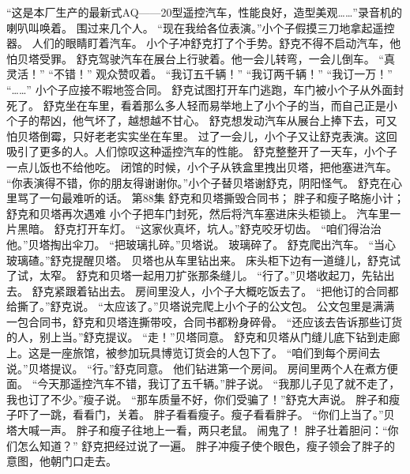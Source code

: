 \documentclass[a4paper,12pt,UTF8,twoside]{ctexbook}
\begin{document}
        “这是本厂生产的最新式AQ——20型遥控汽车，性能良好，造型美观……”录音机的喇叭叫唤着。 
        围过来几个人。 
        “现在我给各位表演。”小个子假摸三刀地拿起遥控器。 
        人们的眼睛盯着汽车。 
        小个子冲舒克打了个手势。舒克不得不启动汽车，他怕贝塔受罪。 
        舒克驾驶汽车在展台上行驶着。他一会儿转弯，一会儿倒车。 
        “真灵活！” 
        “不错！” 
        观众赞叹着。 
        “我订五千辆！” 
        “我订两千辆！” 
        “我订一万！” 
        “……” 
        小个子应接不暇地签合同。 
        舒克试图打开车门逃跑，车门被小个子从外面封死了。 
        舒克坐在车里，看着那么多人轻而易举地上了小个子的当，而自己正是小个子的帮凶，他气坏了，越想越不甘心。 
        舒克想发动汽车从展台上捧下去，可又怕贝塔倒霉，只好老老实实坐在车里。 
        过了一会儿，小个子又让舒克表演。这回吸引了更多的人。人们惊叹这种遥控汽车的性能。 
        舒克整整开了一天车，小个子一点儿饭也不给他吃。 
        闭馆的时候，小个子从铁盒里拽出贝塔，把他塞进汽车。 
        “你表演得不错，你的朋友得谢谢你。”小个子替贝塔谢舒克，阴阳怪气。 
        舒克在心里骂了一句最难听的话。       第88集 
        舒克和贝塔撕毁合同书； 
        胖子和瘦子略施小计； 
        舒克和贝塔再次遇难   
        小个子把车门封死，然后将汽车塞进床头柜锁上。 
        汽车里一片黑暗。 
        舒克打开车灯。 
        “这家伙真坏，坑人。”舒克咬牙切齿。 
        “咱们得治治他。”贝塔掏出伞刀。 
        “把玻璃扎碎。”贝塔说。 
        玻璃碎了。 
        舒克爬出汽车。 
        “当心玻璃碴。”舒克提醒贝塔。 
        贝塔也从车里钻出来。 
        床头柜下边有一道缝儿，舒克试了试，太窄。 
        舒克和贝塔一起用刀扩张那条缝儿。 
        “行了。”贝塔收起刀，先钻出去。 
        舒克紧跟着钻出去。 
        房间里没人，小个子大概吃饭去了。 
        “把他订的合同都给撕了。”舒克说。 
        “太应该了。”贝塔说完爬上小个子的公文包。 
        公文包里是满满一包合同书，舒克和贝塔连撕带咬，合同书都粉身碎骨。 
        “还应该去告诉那些订货的人，别上当。”舒克提议。 
        “走！”贝塔同意。 
        舒克和贝塔从门缝儿底下钻到走廊上。这是一座旅馆，被参加玩具博览订货会的人包下了。 
        “咱们到每个房间去说。”贝塔提议。 
        “行。”舒克同意。 
        他们钻进第一个房间。 
        房间里两个人在煮方便面。 
        “今天那遥控汽车不错，我订了五千辆。”胖子说。 
        “我那儿子见了就不走了，我也订了不少。”瘦子说。 
        “那车质量不好，你们受骗了！”舒克大声说。 
        胖子和瘦子吓了一跳，看看门，关着。 
        胖子看看瘦子。瘦子看看胖子。 
        “你们上当了。”贝塔大喊一声。 
        胖子和瘦子往地上一看，两只老鼠。 
        闹鬼了！ 
        胖子壮着胆问：“你们怎么知道？” 
        舒克把经过说了一遍。 
        胖子冲瘦子使个眼色，瘦子领会了胖子的意图，他朝门口走去。 
\end{document}
